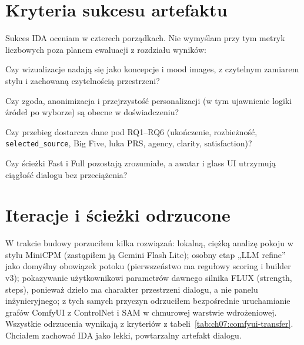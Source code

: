 \section{Kryteria sukcesu artefaktu}
\label{ch07:sec:kryteria}

Sukces IDA oceniam w czterech porządkach. Nie wymyślam przy tym metryk liczbowych poza planem ewaluacji z rozdziału wyników:

\begin{description}[style=nextline]
  \item[Estetyczny]
    Czy wizualizacje nadają się jako koncepcje i mood images, z czytelnym zamiarem stylu i zachowaną czytelnością przestrzeni?
  \item[Etyczny]
    Czy zgoda, anonimizacja i przejrzystość personalizacji (w tym ujawnienie logiki źródeł po wyborze) są obecne w doświadczeniu?
  \item[Badawczy]
    Czy przebieg dostarcza dane pod RQ1--RQ6 (ukończenie, rozbieżność, \texttt{selected\_source}, Big Five, luka PRS, agency, clarity, satisfaction)?
  \item[Produktowy]
    Czy ścieżki Fast i Full pozostają zrozumiałe, a awatar i glass UI utrzymują ciągłość dialogu bez przeciążenia?
\end{description}

\section{Iteracje i ścieżki odrzucone}
\label{ch07:sec:iteracje}

W trakcie budowy porzuciłem kilka rozwiązań: lokalną, ciężką analizę pokoju w stylu MiniCPM (zastąpiłem ją Gemini Flash Lite); osobny etap „LLM refine” jako domyślny obowiązek potoku (pierwszeństwo ma regułowy scoring i builder v3); pokazywanie użytkownikowi parametrów dawnego silnika FLUX (strength, steps), ponieważ dzieło ma charakter przestrzeni dialogu, a nie panelu inżynieryjnego; z tych samych przyczyn odrzuciłem bezpośrednie uruchamianie grafów ComfyUI z ControlNet i SAM w chmurowej warstwie wdrożeniowej.
Wszystkie odrzucenia wynikają z kryteriów z tabeli~\ref{tab:ch07:comfyui-transfer}. Chciałem zachować IDA jako lekki, powtarzalny artefakt dialogu.

